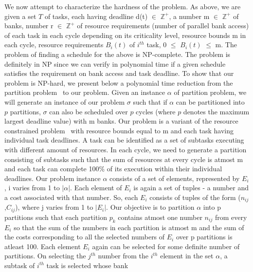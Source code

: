 \noindent
We now attempt to characterize the hardness of the problem. As above, we are given a set $T$ of tasks, each having deadline 
d(t) $\in$ $\mathbb{Z^{+}}$, a number m $\in$ $\mathbb{Z^{+}}$ of banks, number r $\in$ $\mathbb{Z^{+}}$ of resource 
requirements (number of parallel bank access) of each task in each cycle depending on its criticality level, resource bounds 
m in each cycle, resource requirements $B_{i}(t)$ of $i^{th}$ task, 
0 $\leq$ $B_{i}(t)$ $\leq$ m. The problem of finding a schedule for the above is NP-complete. The problem is definitely in NP 
since we can verify in polynomial time if a given schedule satisfies the requirement on bank access and task deadline. 
To show that our problem is NP-hard, we present below a polynomial time reduction from the partition problem~\cite{wiki:xxx7} 
to our problem.
Given an instance $\alpha$ of partition problem, we will generate an instance of our problem $\sigma$ such that if $\alpha$
can be partitioned into $p$ partitions, $\sigma$ can also be scheduled over $p$ cycles (where $p$ denotes the maximum largest 
deadline value) with m banks.
\newline
\newline
Our problem is a variant of the resource constrained problem~\cite{garey2002computers} with resource bounds equal to m and 
each task having individual task deadlines. A task can be identified as a set of subtasks executing with different amount of 
resources. In each cycle, we need to generate a partition consisting of subtasks such that the sum of resources at every cycle 
is atmost m and each task can complete 100\% of its execution within their individual deadlines. 
\newline
\newline
Our problem instance $\alpha$ consists of a set of elements, represented by $E_{i}$, i varies from 1 to $|\alpha|$. 
Each element of $E_{i}$ is again a set of tuples - a number and a cost associated with that number. So, each $E_{i}$ consists 
of tuples of the form ($n_{ij}$,$C_{ij}$), where j varies from 1 to $|E_{i}|$. Our objective is to partition $\alpha$ into 
p partitions such that each partition $p_{k}$ contains atmost one number $n_{ij}$ from every $E_{i}$ so that the sum of the 
numbers in each partition is atmost m and the sum of the costs corresponding to all the selected numbers of $E_{i}$ over p 
partitions is atleast 100. Each element $E_{i}$ again can be selected for some definite number of partitions.  
On selecting the $j^{th}$ number from the $i^{th}$ element in the set $\alpha$, a subtask of $i^{th}$ task is selected whose bank 
